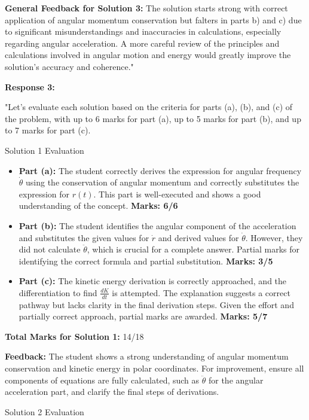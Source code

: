 \documentclass[a4paper,11pt]{article}
\begin{document}
\textbf{General Feedback for Solution 3:} The solution starts strong with correct application of angular momentum conservation but falters in parts b) and c) due to significant misunderstandings and inaccuracies in calculations, especially regarding angular acceleration. A more careful review of the principles and calculations involved in angular motion and energy would greatly improve the solution's accuracy and coherence."

\textbf{Response 3:}

"Let's evaluate each solution based on the criteria for parts (a), (b), and (c) of the problem, with up to 6 marks for part (a), up to 5 marks for part (b), and up to 7 marks for part (c).

Solution 1 Evaluation

\begin{itemize}
    \item \textbf{Part (a):} The student correctly derives the expression for angular frequency \(\dot{\theta}\) using the conservation of angular momentum and correctly substitutes the expression for \(r(t)\). This part is well-executed and shows a good understanding of the concept. \textbf{Marks: 6/6}
    \item \textbf{Part (b):} The student identifies the angular component of the acceleration and substitutes the given values for \(\dot{r}\) and derived values for \(\dot{\theta}\). However, they did not calculate \(\ddot{\theta}\), which is crucial for a complete answer. Partial marks for identifying the correct formula and partial substitution. \textbf{Marks: 3/5}
    \item \textbf{Part (c):} The kinetic energy derivation is correctly approached, and the differentiation to find \(\frac{dK}{dt}\) is attempted. The explanation suggests a correct pathway but lacks clarity in the final derivation steps. Given the effort and partially correct approach, partial marks are awarded. \textbf{Marks: 5/7}
\end{itemize}

\textbf{Total Marks for Solution 1:} 14/18

\textbf{Feedback:} The student shows a strong understanding of angular momentum conservation and kinetic energy in polar coordinates. For improvement, ensure all components of equations are fully calculated, such as \(\ddot{\theta}\) for the angular acceleration part, and clarify the final steps of derivations.

Solution 2 Evaluation
\end{document}
